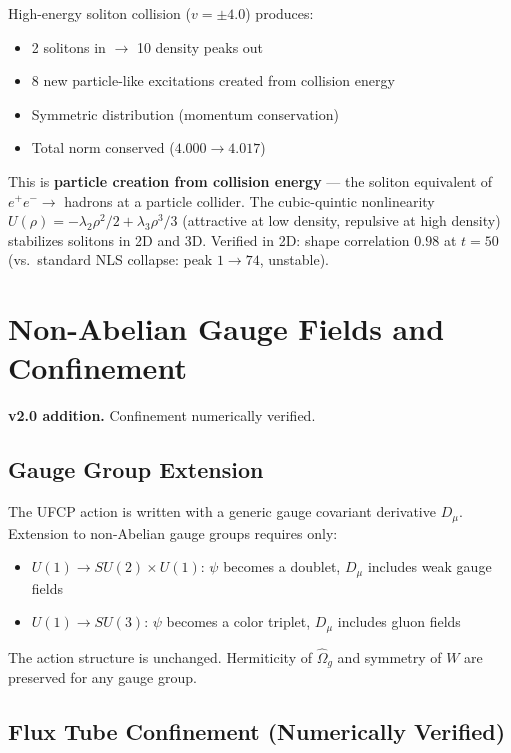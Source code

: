 \documentclass[11pt, a4paper]{article}
\begin{document}
High-energy soliton collision ($v = \pm 4.0$) produces:
\begin{itemize}[nosep]
  \item 2 solitons in $\to$ 10 density peaks out
  \item 8 new particle-like excitations created from collision energy
  \item Symmetric distribution (momentum conservation)
  \item Total norm conserved ($4.000 \to 4.017$)
\end{itemize}

This is \textbf{particle creation from collision energy} --- the
soliton equivalent of $e^+e^- \to$ hadrons at a particle collider.
The cubic-quintic nonlinearity
$U(\rho) = -\lambda_2\rho^2/2 + \lambda_3\rho^3/3$ (attractive at low
density, repulsive at high density) stabilizes solitons in 2D and 3D.
Verified in 2D: shape correlation $0.98$ at $t = 50$ (vs.\ standard NLS
collapse: peak $1 \to 74$, unstable).

\section{Non-Abelian Gauge Fields and Confinement}
\label{sec:confinement}

\textbf{v2.0 addition.} Confinement numerically verified.

\subsection{Gauge Group Extension}

The UFCP action is written with a generic gauge covariant derivative
$D_\mu$. Extension to non-Abelian gauge groups requires only:
\begin{itemize}[nosep]
  \item $U(1) \to SU(2) \times U(1)$: $\psi$ becomes a doublet,
        $D_\mu$ includes weak gauge fields
  \item $U(1) \to SU(3)$: $\psi$ becomes a color triplet,
        $D_\mu$ includes gluon fields
\end{itemize}

The action structure is unchanged. Hermiticity of $\hat{\Omega}_g$
and symmetry of $W$ are preserved for any gauge group.

\subsection{Flux Tube Confinement (Numerically Verified)}
\end{document}
